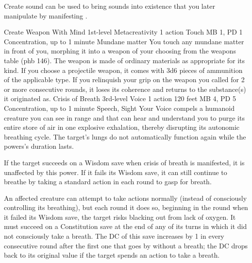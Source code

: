 Create sound can be used to bring sounds into existence that
you later manipulate by manifesting .

\DndPowerHeader%
    {Create Weapon With Mind\label{pwr:create_weapon_with_mind}}
    {1st-level Metacreativity}
    {1 action}
    {Touch}
    {MB 1, PD 1}
    {Concentration, up to 1 minute}
    {Mundane matter}
You touch any mundane matter in front of
you, morphing it into a weapon of your choosing from the weapons
table (phb 146). The weapon is made of ordinary materials
as appropriate for its kind. If you choose a projectile weapon,
it comes with 3d6 pieces of ammunition of the applicable type.
If you relinquish your grip on the weapon you called for 2
or more consecutive rounds, it loses its coherence and returns
to the substance(s) it originated as.
\DndPowerHeader%
    {Crisis of Breath\label{pwr:crisis_of_breath}}
    {3rd-level Voice}
    {1 action}
    {120 feet}
    {MB 4, PD 5}
    {Concentration, up to 1 minute}
    {Speech, Sight}
Your Voice compels a humanoid creature you
can see in range
and that can hear and understand you
to purge its entire store of air in one explosive
exhalation, thereby disrupting its autonomic breathing
cycle. The target's lungs do not automatically function again
while the powers's duration lasts.

If the target succeeds on a Wisdom save when crisis of breath
is manifested, it is unaffected by this power. If it fails
its Wisdom save, it can still continue to breathe by taking
a standard action in each round to gasp for breath.

An affected creature can attempt to take actions normally
(instead of consciously controlling its breathing), but each
round it does so, beginning in the round when it failed its
Wisdom save, the target risks blacking out from lack of oxygen.
It must succeed on a Constitution save at the end of any of
its turns in which it did not consciously take a breath. The
DC of this save increases by 1 in every consecutive round
after the first one that goes by without a breath; the DC
drops back to its original value if the target spends an action
to take a breath.

